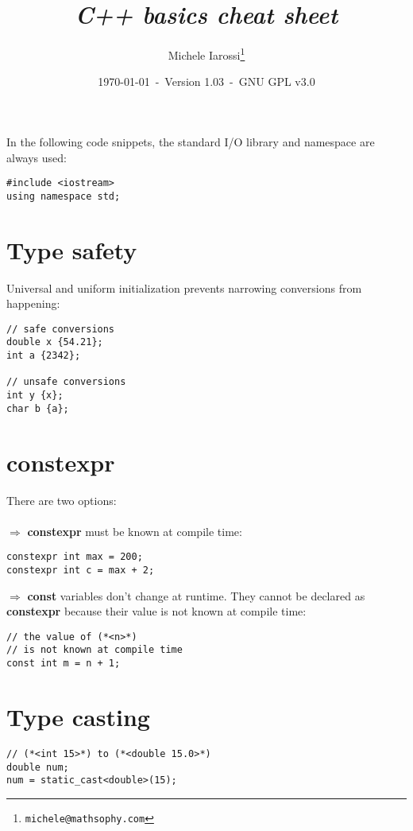 \documentclass[10pt]{article}
\begin{document}
\title{\emph{C++ basics cheat sheet}}
\author{Michele Iarossi\thanks{\texttt{michele@mathsophy.com}}}
\date{\small \today~-~Version 1.03~-~GNU GPL v3.0}


\maketitle

\begin{multicols*}{3}
\raggedcolumns
\small
\noindent
In the following code snippets, the standard I/O library and namespace are always used:
\begin{lstlisting}
#include <iostream>
using namespace std;
\end{lstlisting}
%
%
\section*{Type safety}
\small
Universal and uniform initialization prevents narrowing
conversions from happening:
\begin{lstlisting}
// safe conversions
double x {54.21};
int a {2342};

// unsafe conversions
int y {x};
char b {a};
\end{lstlisting}
%
%
\section*{constexpr}
\small
There are two options:\\ \\
$\Rightarrow$ \textbf{constexpr} must be known at compile time:
\begin{lstlisting}
constexpr int max = 200;
constexpr int c = max + 2;
\end{lstlisting}
$\Rightarrow$ \textbf{const} variables don't change at runtime. They cannot be declared as
\textbf{constexpr} because their value is not known at compile time:
\begin{lstlisting}
// the value of (*<n>*)
// is not known at compile time
const int m = n + 1;
\end{lstlisting}
%
%
\section*{Type casting}
\small
\begin{lstlisting}
// (*<int 15>*) to (*<double 15.0>*)
double num;
num = static_cast<double>(15);
\end{lstlisting}
%
%

\end{multicols*}
\end{document}
